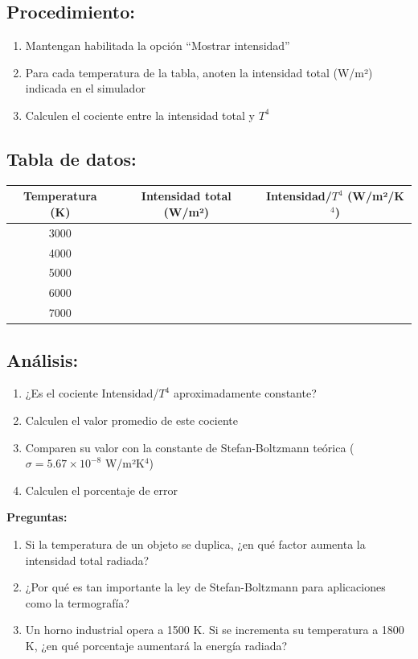 \documentclass[12pt,a4paper]{article}
\begin{document}
	\subsection{Procedimiento:}
	\begin{enumerate}
		\item Mantengan habilitada la opción ``Mostrar intensidad''
		\item Para cada temperatura de la tabla, anoten la intensidad total (W/m²) indicada en el simulador
		\item Calculen el cociente entre la intensidad total y $T^4$
	\end{enumerate}
	
	\subsection{Tabla de datos:}
	
	\begin{center}
		\begin{tabular}{|c|c|c|}
			\hline
			\textbf{Temperatura (K)} & \textbf{Intensidad total (W/m²)} & \textbf{Intensidad/$T^4$ (W/m²/K$^4$)} \\
			\hline
			3000 & & \\
			\hline
			4000 & & \\
			\hline
			5000 & & \\
			\hline
			6000 & & \\
			\hline
			7000 & & \\
			\hline
		\end{tabular}
	\end{center}
	
	\subsection{Análisis:}
	\begin{enumerate}
		\item ¿Es el cociente Intensidad/$T^4$ aproximadamente constante?
		\item Calculen el valor promedio de este cociente
		\item Comparen su valor con la constante de Stefan-Boltzmann teórica ($\sigma = 5.67 \times 10^{-8}$ W/m²K$^4$)
		\item Calculen el porcentaje de error
	\end{enumerate}
	
	\begin{preguntabox}
		\textbf{Preguntas:}
		\begin{enumerate}
			\item Si la temperatura de un objeto se duplica, ¿en qué factor aumenta la intensidad total radiada?
			\item ¿Por qué es tan importante la ley de Stefan-Boltzmann para aplicaciones como la termografía?
			\item Un horno industrial opera a 1500 K. Si se incrementa su temperatura a 1800 K, ¿en qué porcentaje aumentará la energía radiada?
		\end{enumerate}
	\end{preguntabox}
	
\end{document}
